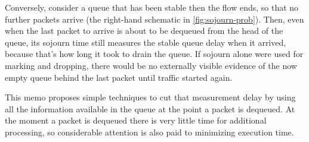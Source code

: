 Conversely, consider a queue that has been stable then the flow ends, so that no further packets arrive (the right-hand schematic in \autoref{fig:sojourn-prob}). Then, even when the last packet to arrive is about to be dequeued from the head of the queue, its sojourn time still measures the stable queue delay when it arrived, because that's how long it took to drain the queue. If sojourn alone were used for marking and dropping, there would be no externally visible evidence of the now empty queue behind the last packet until traffic started again.

This memo proposes simple techniques to cut that measurement delay by using all the information available in the queue at the point a packet is dequeued. At the moment a packet is dequeued there is very little time for additional processing, so considerable attention is also paid to minimizing execution time.


